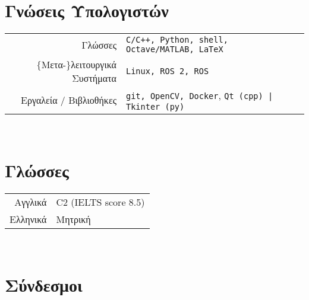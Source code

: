 \documentclass[a4paper,10pt,twoside]{article}
\begin{document}
\section{Γνώσεις Υπολογιστών}

\begin{tabular}{rp{9cm}}
Γλώσσες                             & \texttt{C/C++, Python, shell, Octave/MATLAB, LaTeX} \\
$\{$Μετα-$\}$λειτουργικά Συστήματα  & \texttt{Linux, ROS 2, ROS} \\
  Εργαλεία / Βιβλιοθήκες            & \texttt{git, OpenCV, Docker}, \texttt{Qt (cpp) | Tkinter (py)}
\end{tabular} \\



\section{Γλώσσες}
\begin{tabular}{rp{12cm}}
Αγγλικά & C2 (IELTS score 8.5) \\
Ελληνικά & Μητρική
\end{tabular} \\


\section{Σύνδεσμοι}
\end{document}
